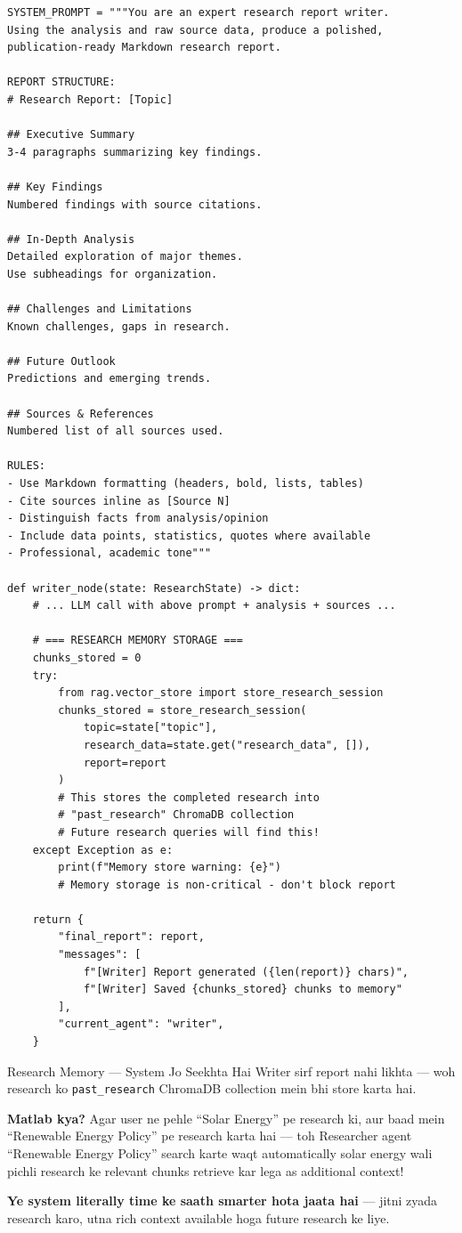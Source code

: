 \documentclass[11pt,a4paper,twoside]{report}
\begin{document}
\begin{lstlisting}[style=pythonstyle,caption={writer.py --- Report Generation + Memory Storage}]
SYSTEM_PROMPT = """You are an expert research report writer.
Using the analysis and raw source data, produce a polished,
publication-ready Markdown research report.

REPORT STRUCTURE:
# Research Report: [Topic]

## Executive Summary
3-4 paragraphs summarizing key findings.

## Key Findings
Numbered findings with source citations.

## In-Depth Analysis
Detailed exploration of major themes.
Use subheadings for organization.

## Challenges and Limitations
Known challenges, gaps in research.

## Future Outlook
Predictions and emerging trends.

## Sources & References
Numbered list of all sources used.

RULES:
- Use Markdown formatting (headers, bold, lists, tables)
- Cite sources inline as [Source N]
- Distinguish facts from analysis/opinion
- Include data points, statistics, quotes where available
- Professional, academic tone"""

def writer_node(state: ResearchState) -> dict:
    # ... LLM call with above prompt + analysis + sources ...

    # === RESEARCH MEMORY STORAGE ===
    chunks_stored = 0
    try:
        from rag.vector_store import store_research_session
        chunks_stored = store_research_session(
            topic=state["topic"],
            research_data=state.get("research_data", []),
            report=report
        )
        # This stores the completed research into
        # "past_research" ChromaDB collection
        # Future research queries will find this!
    except Exception as e:
        print(f"Memory store warning: {e}")
        # Memory storage is non-critical - don't block report

    return {
        "final_report": report,
        "messages": [
            f"[Writer] Report generated ({len(report)} chars)",
            f"[Writer] Saved {chunks_stored} chunks to memory"
        ],
        "current_agent": "writer",
    }
\end{lstlisting}

\begin{conceptbox}{Research Memory --- System Jo Seekhta Hai}
Writer sirf report nahi likhta --- woh research ko \texttt{past\_research} ChromaDB collection mein bhi store karta hai.

\textbf{Matlab kya?} Agar user ne pehle ``Solar Energy'' pe research ki, aur baad mein ``Renewable Energy Policy'' pe research karta hai --- toh Researcher agent ``Renewable Energy Policy'' search karte waqt automatically solar energy wali pichli research ke relevant chunks retrieve kar lega as additional context!

\textbf{Ye system literally time ke saath smarter hota jaata hai} --- jitni zyada research karo, utna rich context available hoga future research ke liye.
\end{conceptbox}
\end{document}
